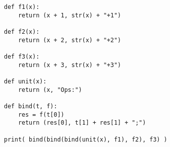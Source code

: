 \begin{lstlisting}
def f1(x):
	return (x + 1, str(x) + "+1")

def f2(x):
	return (x + 2, str(x) + "+2")

def f3(x):
	return (x + 3, str(x) + "+3")

def unit(x):
	return (x, "Ops:")
	
def bind(t, f):
	res = f(t[0])
	return (res[0], t[1] + res[1] + ";")
	
print( bind(bind(bind(unit(x), f1), f2), f3) )
\end{lstlisting}


\newpage